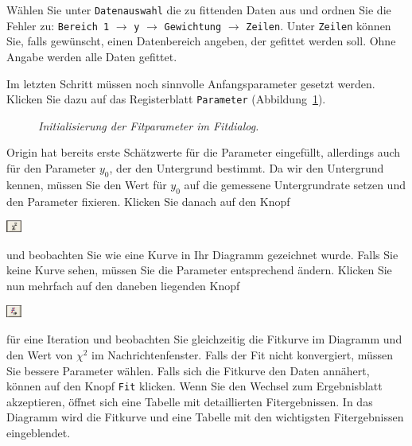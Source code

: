 \documentclass[landscape,twocolumn]{article}
\begin{document}
\begin{enumerate}
W\"{a}hlen Sie unter \verb"Datenauswahl" die zu fittenden Daten aus und ordnen Sie die Fehler zu:
\verb"Bereich 1" $\rightarrow$ \verb"y" $\rightarrow$ \verb"Gewichtung" $\rightarrow$ \verb"Zeilen".
Unter \verb"Zeilen" k\"{o}nnen Sie, falls gew\"{u}nscht, einen Datenbereich angeben, der gefittet werden soll. Ohne Angabe werden alle Daten gefittet.

Im letzten Schritt m\"{u}ssen noch sinnvolle Anfangsparameter gesetzt werden. Klicken Sie dazu auf das Registerblatt \verb"Parameter" (Abbildung~\ref{252_soft3}).
\begin{figure}[h]
\begin{minipage}[c]{12cm}
\centering{}
\caption{\fontsize{10}{12}\it \label{252_soft3} Initialisierung der Fitparameter im Fitdialog.}
\end{minipage}
\end{figure}

Origin hat bereits erste Sch\"{a}tzwerte f\"{u}r die Parameter eingef\"{u}llt, allerdings auch f\"{u}r den Parameter $y_0$, der den Untergrund bestimmt. Da wir den  Untergrund kennen, m\"{u}ssen Sie den Wert f\"{u}r $y_0$ auf die gemessene Untergrundrate setzen und den Parameter fixieren.
Klicken Sie danach auf den Knopf \begin{minipage}{5mm}
\includegraphics[height=4mm]{icon_chi2.eps}\end{minipage} und beobachten Sie wie eine Kurve in Ihr Diagramm gezeichnet wurde. Falls Sie keine Kurve sehen, m\"{u}ssen Sie die Parameter entsprechend \"{a}ndern.  Klicken Sie nun mehrfach auf den daneben liegenden Knopf \begin{minipage}{5mm}
\includegraphics[height=4mm]{icon_1it.eps}\end{minipage} f\"{u}r eine Iteration und beobachten Sie gleichzeitig die Fitkurve im Diagramm und den Wert von $\chi^2$ im Nachrichtenfenster. Falls der Fit nicht konvergiert, m\"{u}ssen Sie bessere Parameter w\"{a}hlen. Falls sich die Fitkurve den Daten ann\"{a}hert, k\"{o}nnen auf den Knopf \verb"Fit" klicken. Wenn Sie den Wechsel zum Ergebnisblatt akzeptieren, \"{o}ffnet sich eine Tabelle mit detaillierten Fitergebnissen. In das Diagramm wird die Fitkurve und eine Tabelle mit den wichtigsten Fitergebnissen eingeblendet.


\end{enumerate}
\end{document}
